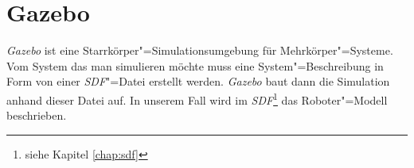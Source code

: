%	
%	
%	
%	
%
% 	
% 
%
%
%	
%
%

\section{Gazebo}
\label{chap:gazebo}

\textit{Gazebo} ist eine Starrkörper"=Simulationsumgebung für Mehrkörper"=Systeme.
Vom System das man simulieren möchte muss eine System"=Beschreibung in Form von einer \textit{SDF}"=Datei erstellt werden.
\textit{Gazebo} baut dann die Simulation anhand dieser Datei auf. 
In unserem Fall wird im \textit{SDF}\footnote{siehe Kapitel \ref{chap:sdf}} das Roboter"=Modell beschrieben.

